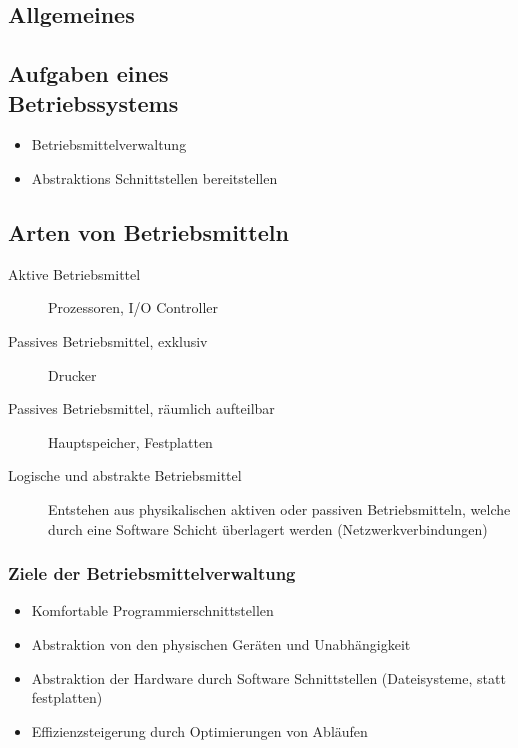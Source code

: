 \documentclass[10pt,a4paper]{article}
\begin{document}
\begin{multicols*}{4}
\section{Allgemeines}\label{sec:allgemeines}

\subsection{Aufgaben eines\\Betriebssystems}\label{subsec:aufgaben-eines-betriebssystems}
\begin{itemize}
	\item Betriebsmittelverwaltung
	\item Abstraktions Schnittstellen bereitstellen
\end{itemize}

\subsection{Arten von Betriebsmitteln}\label{subsec:arten-von-betriebsmitteln}

\begin{description}
	\item[Aktive Betriebsmittel]
	      Prozessoren, I/O Controller
	\item[Passives Betriebsmittel, exklusiv]
	      Drucker
	\item[Passives Betriebsmittel, räumlich aufteilbar]
	      Hauptspeicher, Festplatten
	\item[Logische und abstrakte Betriebsmittel]
	      Entstehen aus physikalischen aktiven oder passiven Betriebsmitteln,
	      welche durch eine Software Schicht überlagert werden (Netzwerkverbindungen)
\end{description}

\subsubsection{Ziele der Betriebsmittelverwaltung}
\begin{itemize}
	\item Komfortable Programmierschnittstellen
	\item Abstraktion von den physischen Geräten und Unabhängigkeit
	\item Abstraktion der Hardware durch Software Schnittstellen (Dateisysteme, statt festplatten)
	\item Effizienzsteigerung durch Optimierungen von Abläufen
\end{itemize}


\end{multicols*}
\end{document}
